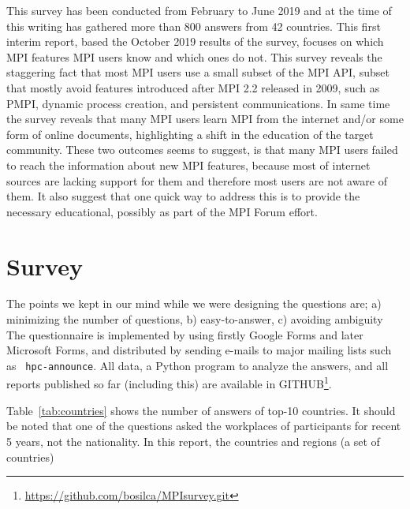 \documentclass[sigconf,nonacm]{acmart}
\begin{document}
This survey has been conducted from February to June 2019 and at the time of
this writing has gathered more than 800 answers from 42 countries.
%
This first interim report, based the October 2019 results of the survey,
focuses on which MPI features MPI users know and which ones do not.
%
This survey reveals the staggering fact that most MPI users use a small subset
of the MPI API, subset that mostly avoid features introduced after MPI 2.2
released in 2009, such as PMPI, dynamic process creation, and persistent
communications. In same time the survey reveals that many MPI users learn MPI
from the internet and/or some form of online documents, highlighting a shift in
the education of the target community.
%
These two outcomes seems to suggest, is that many MPI users failed to reach the
information about new MPI features, because most of internet sources are lacking
support for them and therefore most users are not aware of them. It also suggest
that one quick way to address this is to provide the necessary educational,
possibly as part of the MPI Forum effort.

\section{Survey}

The points we kept in our mind while we were designing the questions are; a)
minimizing the number of questions, b) easy-to-answer, c) avoiding ambiguity The
questionnaire is implemented by using firstly Google Forms and later Microsoft
Forms, and distributed by sending e-mails to major mailing lists such as {\tt
hpc-announce}. All data, a Python program to analyze the answers, and all
reports published so far (including this) are available in
GITHUB\footnote{\url{https://github.com/bosilca/MPIsurvey.git}}.

Table~\ref{tab:countries} shows the number of answers of top-10
countries. It should be noted that one of the questions asked the
workplaces of participants for recent 5 years, not the nationality.
In this report, the countries and regions (a set of countries)
\vspace{-3mm}
\end{document}
